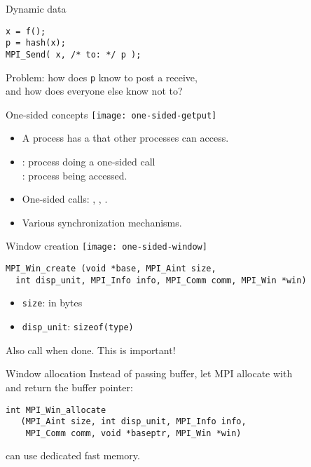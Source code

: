 \begin{numberedframe}{Dynamic data}
\begin{lstlisting}
x = f();
p = hash(x);
MPI_Send( x, /* to: */ p );
\end{lstlisting}
Problem: how does \lstinline{p} know to post a receive,\\
and how does everyone else know not to?
\end{numberedframe}

\begin{numberedframe}{One-sided concepts}
  \texttt{[image: one-sided-getput]}
  \begin{itemize}
  \item A process has a  that other processes can access.
  \item {}: process doing a one-sided call\\
    : process being accessed.
  \item One-sided calls: , , .
  \item Various synchronization mechanisms.
  \end{itemize}
\end{numberedframe}

\begin{numberedframe}{Window creation}
  \texttt{[image: one-sided-window]}
\lstset{language=C}
\begin{lstlisting}
MPI_Win_create (void *base, MPI_Aint size, 
  int disp_unit, MPI_Info info, MPI_Comm comm, MPI_Win *win)
\end{lstlisting}
\begin{itemize}
\item \lstinline{size}: in bytes
\item \lstinline{disp_unit}: \lstinline{sizeof(type)}
\end{itemize}
Also call  when done. This is important!
\end{numberedframe}

\begin{numberedframe}{Window allocation}
  Instead of passing buffer, let MPI allocate with
  \\
  and return the buffer pointer:
\lstset{language=C}
\begin{lstlisting}
int MPI_Win_allocate
   (MPI_Aint size, int disp_unit, MPI_Info info,
    MPI_Comm comm, void *baseptr, MPI_Win *win)
\end{lstlisting}
can use dedicated fast memory.
\end{numberedframe}

